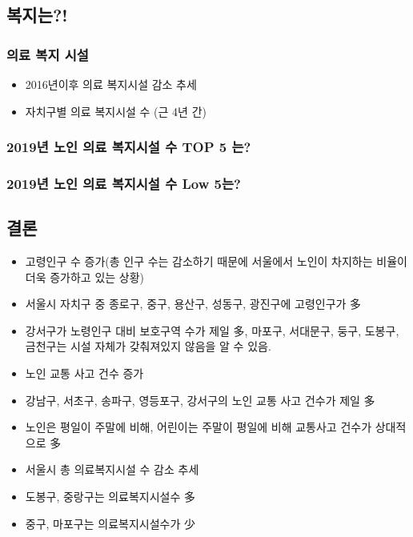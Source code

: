 \documentclass[11pt]{article}
\providecommand{\tightlist}{%
      \setlength{\itemsep}{0pt}\setlength{\parskip}{0pt}}
\begin{document}
     

    \subsection{복지는?!}\label{uxbcf5uxc9c0uxb294}

    \subsubsection{의료 복지
시설}\label{uxc758uxb8cc-uxbcf5uxc9c0-uxc2dcuxc124}

\begin{itemize}
\tightlist
\item
  2016년이후 의료 복지시설 감소 추세
\end{itemize}

    

    \begin{itemize}
\tightlist
\item
  자치구별 의료 복지시설 수 (근 4년 간)
\end{itemize}

    

    \subsubsection{2019년 노인 의료 복지시설 수 TOP 5
는?}\label{uxb144-uxb178uxc778-uxc758uxb8cc-uxbcf5uxc9c0uxc2dcuxc124-uxc218-top-5-uxb294}

    \subsubsection{2019년 노인 의료 복지시설 수 Low
5는?}\label{uxb144-uxb178uxc778-uxc758uxb8cc-uxbcf5uxc9c0uxc2dcuxc124-uxc218-low-5uxb294}

    \subsection{결론}\label{uxacb0uxb860}

    \begin{itemize}
\item
  고령인구 수 증가(총 인구 수는 감소하기 때문에 서울에서 노인이 차지하는
  비율이 더욱 증가하고 있는 상황)
\item
  서울시 자치구 중 종로구, 중구, 용산구, 성동구, 광진구에 고령인구가 多
\item
  강서구가 노령인구 대비 보호구역 수가 제일 多, 마포구, 서대문구, 둥구,
  도봉구, 금천구는 시설 자체가 갖춰져있지 않음을 알 수 있음.
\item
  노인 교통 사고 건수 증가
\item
  강남구, 서초구, 송파구, 영등포구, 강서구의 노인 교통 사고 건수가 제일
  多
\item
  노인은 평일이 주말에 비해, 어린이는 주말이 평일에 비해 교통사고 건수가
  상대적으로 多
\item
  서울시 총 의료복지시설 수 감소 추세
\item
  도봉구, 중랑구는 의료복지시설수 多
\item
  중구, 마포구는 의료복지시설수가 少
\end{itemize}
\end{document}
